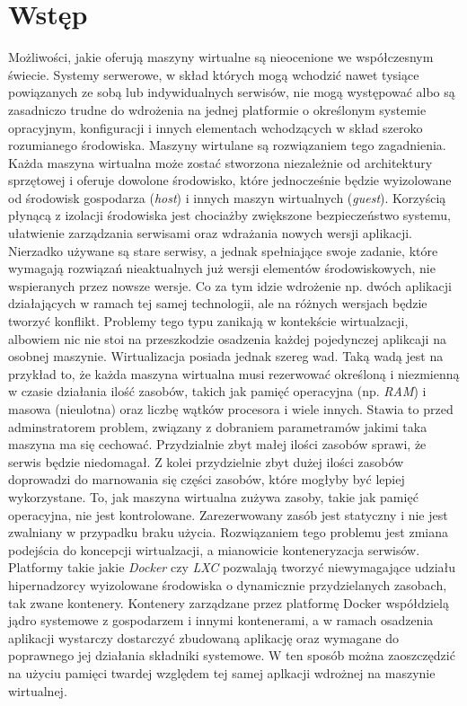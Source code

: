 \documentclass[polish, a4paper, 12pt, oneside]{book}
\begin{document}
\tableofcontents{}

\chapter{Wstęp}
Możliwości, jakie oferują maszyny wirtualne są nieocenione we współczesnym świecie. Systemy serwerowe, w skład których mogą wchodzić nawet tysiące powiązanych ze sobą lub indywidualnych serwisów, nie mogą występować albo są zasadniczo trudne do wdrożenia na jednej platformie o określonym systemie opracyjnym, konfiguracji i innych elementach wchodzących w skład szeroko rozumianego środowiska. Maszyny wirtulane są rozwiązaniem tego zagadnienia. Każda maszyna wirtualna może zostać stworzona niezależnie od architektury sprzętowej i oferuje dowolone środowisko, które jednocześnie będzie wyizolowane od środowisk gospodarza (\textit{host}) i innych maszyn wirtualnych (\textit{guest}). Korzyścią płynącą z izolacji środowiska jest chociażby zwiększone bezpieczeństwo systemu, ułatwienie zarządzania serwisami oraz wdrażania nowych wersji aplikacji. Nierzadko używane są stare serwisy, a jednak spełniające swoje zadanie, które wymagają rozwiązań nieaktualnych już wersji elementów środowiskowych, nie wspieranych przez nowsze wersje. Co za tym idzie wdrożenie np. dwóch aplikacji działających w ramach tej samej technologii, ale na różnych wersjach będzie tworzyć konflikt. Problemy tego typu zanikają w kontekście wirtualzacji, albowiem nic nie stoi na przeszkodzie osadzenia każdej pojedynczej aplikcaji na osobnej maszynie. Wirtualizacja posiada jednak szereg wad. Taką wadą jest na przykład to, że każda maszyna wirtualna musi rezerwować określoną i niezmienną w czasie działania ilość zasobów, takich jak pamięć operacyjna (np. \textit{RAM}) i masowa (nieulotna) oraz liczbę wątków procesora i wiele innych. Stawia to przed adminstratorem problem, związany z dobraniem parametramów jakimi taka maszyna ma się cechować. Przydzialnie zbyt małej ilości zasobów sprawi, że serwis będzie niedomagał. Z kolei przydzielnie zbyt dużej ilości zasobów doprowadzi do marnowania się części zasobów, które mogłyby być lepiej wykorzystane. To, jak maszyna wirtualna zużywa zasoby, takie jak pamięć operacyjna, nie jest kontrolowane. Zarezerwowany zasób jest statyczny i nie jest zwalniany w przypadku braku użycia. Rozwiązaniem tego problemu jest zmiana podejścia do koncepcji wirtualzacji, a mianowicie konteneryzacja serwisów. Platformy takie jakie \textit{Docker}\cite{docker} czy \textit{LXC}\cite{lxc} pozwalają tworzyć niewymagające udziału hipernadzorcy wyizolowane środowiska o dynamicznie przydzielanych zasobach, tak zwane kontenery. Kontenery zarządzane przez platformę Docker współdzielą jądro systemowe z gospodarzem i innymi kontenerami, a w ramach osadzenia aplikacji wystarczy dostarczyć zbudowaną aplikację oraz wymagane do poprawnego jej działania składniki systemowe. W ten sposób można zaoszczędzić na użyciu pamięci twardej względem tej samej aplkacji wdrożnej na maszynie wirtualnej. 
\end{document}
